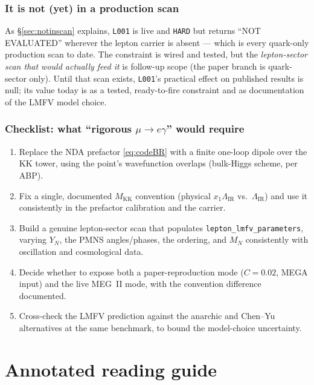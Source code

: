 \documentclass[11pt]{article}
\newcommand{\MKK}{M_{\mathrm{KK}}}
\newcommand{\LIR}{\Lambda_{\mathrm{IR}}}
\newcommand{\YN}{Y_N}
\newcommand{\code}[1]{\texttt{#1}}
\theoremstyle{definition}
\begin{document}
\section{It is not (yet) in a production scan}
As \S\ref{sec:notinscan} explains, \code{L001} is live and \code{HARD} but
returns ``NOT EVALUATED'' wherever the lepton carrier is absent --- which is every
quark-only production scan to date. The constraint is wired and tested, but the
\emph{lepton-sector scan that would actually feed it} is follow-up scope (the
paper branch is quark-sector only). Until that scan exists, \code{L001}'s
practical effect on published results is null; its value today is as a tested,
ready-to-fire constraint and as documentation of the LMFV model choice.

\section{Checklist: what ``rigorous $\mu\to e\gamma$'' would require}
\begin{enumerate}[leftmargin=1.8em]
\item Replace the NDA prefactor \eqref{eq:codeBR} with a finite one-loop dipole
over the KK tower, using the point's wavefunction overlaps (bulk-Higgs scheme,
per ABP).
\item Fix a single, documented $\MKK$ convention (physical $x_1\LIR$ vs.\ $\LIR$)
and use it consistently in the prefactor calibration and the carrier.
\item Build a genuine lepton-sector scan that populates
\code{lepton\_lmfv\_parameters}, varying $\YN$, the PMNS angles/phases, the
ordering, and $M_N$ consistently with oscillation and cosmological data.
\item Decide whether to expose both a paper-reproduction mode ($C=0.02$, MEGA
input) and the live MEG~II mode, with the convention difference documented.
\item Cross-check the LMFV prediction against the anarchic and Chen--Yu
alternatives at the same benchmark, to bound the model-choice uncertainty.
\end{enumerate}

\part*{Annotated reading guide}
\end{document}
